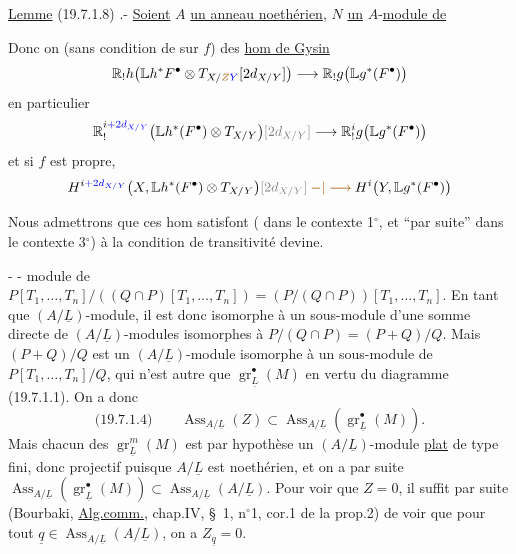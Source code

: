 \uline{Lemme} (19.7.1.8) .- \uline{Soient} $A$ \uline{un anneau noethérien}, $N$ \uline{un} $A$-\uline{module de}

Donc on  (sans condition de
 sur $f$) des \uline{hom de Gysin}
\[
\mathbb{R}_!h\bigl(\mathbb{L}h^*F^\bullet\otimes
 T_{X/\deleted{\unsure{Z}}\inserted{Y}}[2d_{X/Y}]\bigr)
 \longrightarrow \mathbb{R}_!g\bigl(\mathbb{L}g^*(F^\bullet)\bigr)
\]
en particulier
\[
\mathbb{R}_!^{i\inserted{+2d_{X/Y}}}
 \bigl(\mathbb{L}h^*(F^\bullet)\otimes T_{X/Y}\bigr)
 \deleted{[2d_{X/Y}]}
 \longrightarrow \mathbb{R}_!^ig\bigl(\mathbb{L}g^*(F^\bullet)\bigr)
\]
et si $f$ est propre, 
\[
H^{i\inserted{+2d_{X/Y}}}
 \bigl(X,\mathbb{L}h^*(F^\bullet)\otimes T_{X/Y}\bigr)
 \deleted{[2d_{X/Y}]}
 \mathbin{\unsure{-|\longrightarrow}}
 H^i\bigl(Y,\mathbb{L}g^*(F^\bullet)\bigr)
\]

Nous admettrons que ces hom satisfont
( dans le contexte 1$^\circ$, et ``par suite'' dans
le contexte 3$^\circ$) à la condition de
transitivité  devine.

-  -
module de $P[T_1,\ldots,T_n]/((Q\cap P)[T_1,\ldots,T_n])=(P/(Q\cap P))[T_1,\ldots,T_n]$. En tant
que $(A/\underline L)$-module, il est donc isomorphe à un sous-module d'une somme
directe de $(A/\underline L)$-modules isomorphes à $P/(Q\cap P)=(P+Q)/Q$. Mais $(P+Q)/Q$
est un $(A/\underline L)$-module isomorphe à un sous-module de $P[T_1,\ldots,T_n]/Q$, qui
n'est autre que $\operatorname{gr}_{\underline L}^\bullet(M)$ en vertu du diagramme (19.7.1.1). On a donc
\[
\text{(19.7.1.4)}\qquad
\operatorname{Ass}_{A/\underline L}(Z)\subset
 \operatorname{Ass}_{A/\underline L}(\operatorname{gr}_{\underline L}^\bullet(M)).
\]
Mais chacun des $\operatorname{gr}_{\underline L}^m(M)$ est par hypothèse un $(A/\underline L)$-module \uline{plat} de type
fini, donc projectif puisque $A/\underline L$ est noethérien, et on a par suite
$\operatorname{Ass}_{A/\underline L}(\operatorname{gr}_{\underline L}^\bullet(M))
 \subset\operatorname{Ass}_{A/\underline L}(A/\underline L)$.
Pour voir que $Z=0$, il suffit par suite (Bourbaki, \uline{Alg.comm.}, chap.IV, \S~1,
n$^\circ$1, cor.1 de la prop.2) de voir que pour
tout 
$\underline q\in\operatorname{Ass}_{A/\underline L}(A/\underline L)$, on
 a $Z_{\underline q}=0$.

